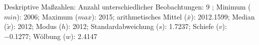 				\label{tableValues:mres042b}
				\vspace*{-\baselineskip}
                    \begin{noten}
                	    \note{} Deskriptive Maßzahlen:
                	    Anzahl unterschiedlicher Beobachtungen: 9%
                	    ; 
                	      Minimum ($min$): 2006; 
                	      Maximum ($max$): 2015; 
                	      arithmetisches Mittel ($\bar{x}$): \num[round-mode=places,round-precision=2]{2012.1599}; 
                	      Median ($\tilde{x}$): 2012; 
                	      Modus ($h$): 2012; 
                	      Standardabweichung ($s$): \num[round-mode=places,round-precision=2]{1.7237}; 
                	      Schiefe ($v$): \num[round-mode=places,round-precision=2]{-0.1277}; 
                	      Wölbung ($w$): \num[round-mode=places,round-precision=2]{2.4147}
                     \end{noten}

